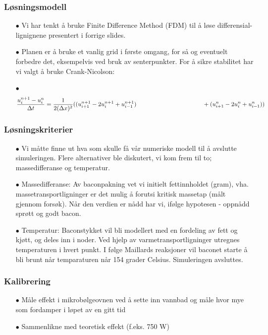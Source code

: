 \documentclass[screen]{beamer}
\begin{document}
\begin{frame}
  \frametitle{Løsningsmodell}
  \begin{itemize}
    \item[$\bullet$] Vi har tenkt å bruke Finite Difference Method (FDM) til å løse differensial-
lignignene presentert i forrige slides.

\item[$\bullet$] Planen er å bruke et vanlig grid i første omgang, for så og eventuelt forbedre
det, eksempelvis ved bruk av senterpunkter. For å sikre stabilitet har vi valgt
å bruke Crank-Nicolson:

\item[$\bullet$] 
\begin{equation*}
  \frac{u_i^{n+1}-u_i^n}{\Delta t} = \frac{1}{2(\Delta x)^2}((
  u_{i+1}^{n+1}-2u_i^{n+1}+u_{i-1}^{n+1}) \\ \hspace{110pt} + (u_{i+1}^{n} - 2u_i^n +
  u_{i-1}^{n}) ) 
\end{equation*}
  \end{itemize}
\end{frame}

\begin{frame}
  \frametitle{Løsningskriterier}
  \begin{center}
  \begin{itemize}  
    \item[$\bullet$] Vi måtte finne ut hva som skulle få vår numeriske modell til å avslutte simuleringen. Flere alternativer ble diskutert, vi kom frem til to; massedifferanse og temperatur.

\item[$\bullet$] Massedifferanse: Av baconpakning vet vi initielt fettinnholdet (gram), vha. massetransportligninger er det mulig å forutsi kritisk massetap (målt gjennom forsøk). Når den verdien er nådd har vi, ifølge hypotesen - oppnådd sprøtt og godt bacon.

\item[$\bullet$] Temperatur: Baconstykket vil bli modellert med en fordeling av fett og kjøtt, og deles inn i noder. Ved hjelp av varmetransportligninger utregnes temperaturen i hvert punkt. I følge Maillards reaksjoner vil baconet starte å bli brunt når temparaturen når 154 grader Celsius. Simuleringen avsluttes.
  \end{itemize}
  \end{center}
\end{frame}

\begin{frame}
  \frametitle{Kalibrering}
  \begin{itemize}
	\item[$\bullet$] Måle effekt i mikrobølgeovnen ved å sette inn vannbad og måle hvor mye
	som fordamper i løpet av en gitt tid
        \item[$\bullet$] Sammenlikne med teoretisk effekt (f.eks. 750 W)
  \end{itemize}
\end{frame}
\end{document}
